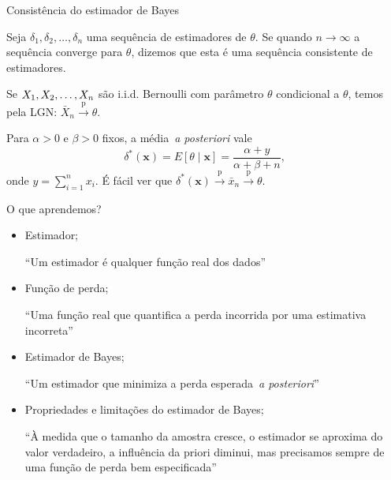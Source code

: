 \begin{frame}{Consistência do estimador de Bayes}
\begin{defn}
\label{def:consistent_estimator}
Seja $\delta_1, \delta_2, \ldots, \delta_n$ uma sequência de estimadores de $\theta$.
Se quando $n \to \infty$ a sequência converge para $\theta$, dizemos que esta é uma sequência consistente de estimadores.
\end{defn} 

\begin{obs}
\label{rmk:Bernoulli_sample_mean_consistent}
 Se $X_1, X_2, \ldots, X_n$ são i.i.d. Bernoulli com parâmetro $\theta$ condicional a $\theta$, temos pela LGN: $\bar{X}_n \xrightarrow{\text{p}} \theta$.
\end{obs}

\begin{obs}
\label{rmk:Bernoulli_BayesEst_consistent}
 Para $\alpha > 0$ e $\beta > 0$ fixos, a média~\textit{a posteriori} vale
 $$\delta^\ast(\boldsymbol{x}) = E[\theta \mid \boldsymbol{x}] = \frac{\alpha + y}{\alpha + \beta + n}, $$
 onde $ y = \sum_{i=1}^n x_i$.
 É fácil ver que $\delta^\ast(\boldsymbol{x}) \xrightarrow{\text{p}} \bar{x}_n \xrightarrow{\text{p}} \theta$.
\end{obs}
\end{frame}

\begin{frame}{O que aprendemos?}
\begin{itemize}
 \item[\faLightbulbO] Estimador;
 
  ``Um estimador é qualquer função real dos dados''
  
 \item[\faLightbulbO] Função de perda;
 
  ``Uma função real que quantifica a perda incorrida por uma estimativa incorreta'' 
 
 \item[\faLightbulbO] Estimador de Bayes;
 
  ``Um estimador que minimiza a perda esperada~\textit{a posteriori}''
  
 \item[\faLightbulbO] Propriedades e limitações do estimador de Bayes;
 
  ``À medida que o tamanho da amostra cresce, o estimador se aproxima do valor verdadeiro, a influência da priori diminui, mas precisamos sempre de uma função de perda bem especificada'' 
 \end{itemize}
 
 \end{frame}

